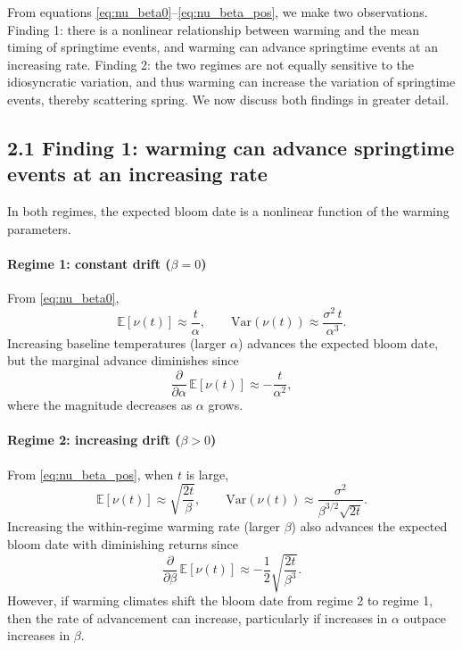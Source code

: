 From equations \eqref{eq:nu_beta0}--\eqref{eq:nu_beta_pos}, we make two
observations. Finding 1: there is a nonlinear relationship between
warming and the mean timing of springtime events, and warming can
advance springtime events at an increasing rate. Finding 2: the two
regimes are not equally sensitive to the idiosyncratic variation, and
thus warming can increase the variation of springtime events, thereby
scattering spring. We now discuss both findings in greater detail.

\subsection{2.1 Finding 1: warming can advance springtime events at an
increasing
rate}\label{finding-1-warming-can-advance-springtime-events-at-an-increasing-rate}

In both regimes, the expected bloom date is a nonlinear function of the
warming parameters.

\paragraph{Regime 1: constant drift ($\beta=0$)}

From \eqref{eq:nu_beta0}, \begin{equation}
\mathbb{E}[\nu(t)] \approx \frac{t}{\alpha},
\qquad
\mathrm{Var}(\nu(t)) \approx \frac{\sigma^2\,t}{\alpha^3}.
\end{equation} Increasing baseline temperatures (larger \(\alpha\))
advances the expected bloom date, but the marginal advance diminishes
since \begin{equation}
\frac{\partial}{\partial \alpha}\,\mathbb{E}[\nu(t)] \approx -\frac{t}{\alpha^2},
\end{equation} where the magnitude decreases as \(\alpha\) grows.

\paragraph{Regime 2: increasing drift ($\beta>0$)}

From \eqref{eq:nu_beta_pos}, when \(t\) is large, \begin{equation}
\mathbb{E}[\nu(t)] \approx \sqrt{\frac{2t}{\beta}},
\qquad
\mathrm{Var}(\nu(t)) \approx \frac{\sigma^2}{\beta^{3/2}\sqrt{2t}}.
\end{equation} Increasing the within-regime warming rate (larger
\(\beta\)) also advances the expected bloom date with diminishing
returns since \begin{equation}
\frac{\partial}{\partial \beta}\,\mathbb{E}[\nu(t)]
\approx
-\frac{1}{2}\sqrt{\frac{2t}{\beta^{3}}}.
\end{equation} However, if warming climates shift the bloom date from
regime 2 to regime 1, then the rate of advancement can increase,
particularly if increases in \(\alpha\) outpace increases in \(\beta\).

